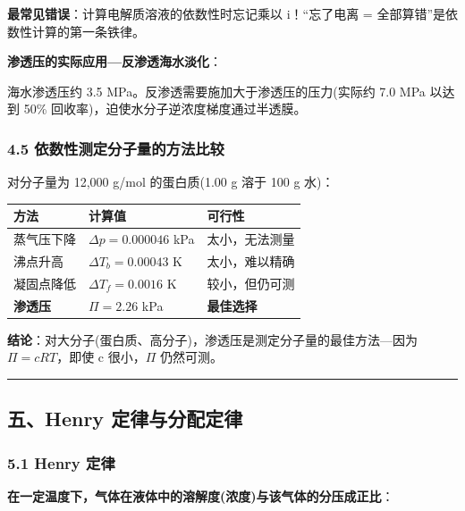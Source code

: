 \textbf{最常见错误}：计算电解质溶液的依数性时忘记乘以 i！``忘了电离 = 全部算错''是依数性计算的第一条铁律。

\textbf{渗透压的实际应用---反渗透海水淡化}：

海水渗透压约 3.5 MPa。反渗透需要施加大于渗透压的压力(实际约 7.0 MPa 以达到 50\% 回收率)，迫使水分子逆浓度梯度通过半透膜。

\subsubsection{4.5 依数性测定分子量的方法比较}\label{ux4f9dux6570ux6027ux6d4bux5b9aux5206ux5b50ux91cfux7684ux65b9ux6cd5ux6bd4ux8f83}

对分子量为 12,000 g/mol 的蛋白质(1.00 g 溶于 100 g 水)：

{\def\LTcaptype{none} %
\begin{longtable}[]{@{}lll@{}}
\toprule\noalign{}
方法 & 计算值 & 可行性 \\
\midrule\noalign{}
\endhead
\bottomrule\noalign{}
\endlastfoot
蒸气压下降 & \(\Delta p = 0.000046\) kPa & 太小，无法测量 \\
沸点升高 & \(\Delta T_b = 0.00043\) K & 太小，难以精确 \\
凝固点降低 & \(\Delta T_f = 0.0016\) K & 较小，但仍可测 \\
\textbf{渗透压} & \(\Pi = 2.26\) kPa & \textbf{最佳选择} \\
\end{longtable}
}

\textbf{结论}：对大分子(蛋白质、高分子)，渗透压是测定分子量的最佳方法---因为 \(\Pi = cRT\)，即使 c 很小，\(\Pi\) 仍然可测。

\begin{center}\rule{0.5\linewidth}{0.5pt}\end{center}

\subsection{五、Henry 定律与分配定律}\label{ux4e94henry-ux5b9aux5f8bux4e0eux5206ux914dux5b9aux5f8b}

\subsubsection{5.1 Henry 定律}\label{henry-ux5b9aux5f8b}

\textbf{在一定温度下，气体在液体中的溶解度(浓度)与该气体的分压成正比}：

